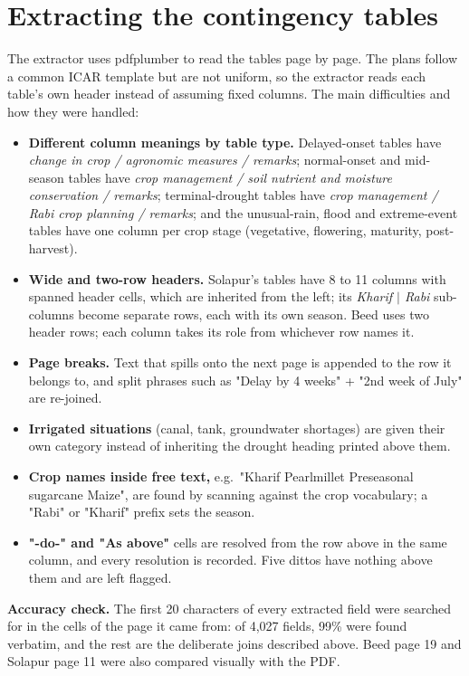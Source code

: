 \section{Extracting the contingency tables}
The extractor uses pdfplumber to read the tables page by page. The plans follow a common ICAR template but are not uniform, so the extractor reads each table's own header instead of assuming fixed columns. The main difficulties and how they were handled:

\begin{itemize}
	\item \textbf{Different column meanings by table type.} Delayed-onset tables have \emph{change in crop / agronomic measures / remarks}; normal-onset and mid-season tables have \emph{crop management / soil nutrient and moisture conservation / remarks}; terminal-drought tables have \emph{crop management / Rabi crop planning / remarks}; and the unusual-rain, flood and extreme-event tables have one column per crop stage (vegetative, flowering, maturity, post-harvest).
	\item \textbf{Wide and two-row headers.} Solapur's tables have 8 to 11 columns with spanned header cells, which are inherited from the left; its \emph{Kharif $|$ Rabi} sub-columns become separate rows, each with its own season. Beed uses two header rows; each column takes its role from whichever row names it.
	\item \textbf{Page breaks.} Text that spills onto the next page is appended to the row it belongs to, and split phrases such as "Delay by 4 weeks" + "2nd week of July" are re-joined.
	\item \textbf{Irrigated situations} (canal, tank, groundwater shortages) are given their own category instead of inheriting the drought heading printed above them.
	\item \textbf{Crop names inside free text,} e.g.\ "Kharif Pearlmillet Preseasonal sugarcane Maize", are found by scanning against the crop vocabulary; a "Rabi" or "Kharif" prefix sets the season.
	\item \textbf{"-do-" and "As above"} cells are resolved from the row above in the same column, and every resolution is recorded. Five dittos have nothing above them and are left flagged.
\end{itemize}

\textbf{Accuracy check.} The first 20 characters of every extracted field were searched for in the cells of the page it came from: of 4,027 fields, 99\% were found verbatim, and the rest are the deliberate joins described above. Beed page 19 and Solapur page 11 were also compared visually with the PDF.

